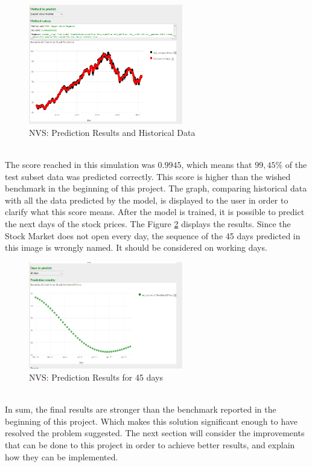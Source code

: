 \begin{figure}[H]
\centering
\includegraphics[width=0.6\textwidth]{figures/predict_svr.png}
\caption{NVS: Prediction Results and Historical Data}
\label{fig:predict_svr}
\end{figure}
\ \\

The score reached in this simulation was $0.9945$, which means that $99,45\%$ of the test subset data was predicted correctly. This score is higher than the wished benchmark in the beginning of this project. The graph, comparing historical data with all the data predicted by the model, is displayed to the user in order to clarify what this score means. After the model is trained, it is possible to predict the next days of the stock prices. The Figure \ref{fig:predict_45days} displays the results. Since the Stock Market does not open every day, the sequence of the 45 days predicted in this image is wrongly named. It should be considered on working days. 

\begin{figure}[H]
\centering
\includegraphics[width=0.6\textwidth]{figures/predict_45days.png}
\caption{NVS: Prediction Results for 45 days}
\label{fig:predict_45days}
\end{figure}
\ \\

In sum, the final results are stronger than the benchmark reported in the beginning of this project. Which makes this solution significant enough to have resolved the problem suggested. The next section will consider the improvements that can be done to this project in order to achieve better results, and explain how they can be implemented. \\